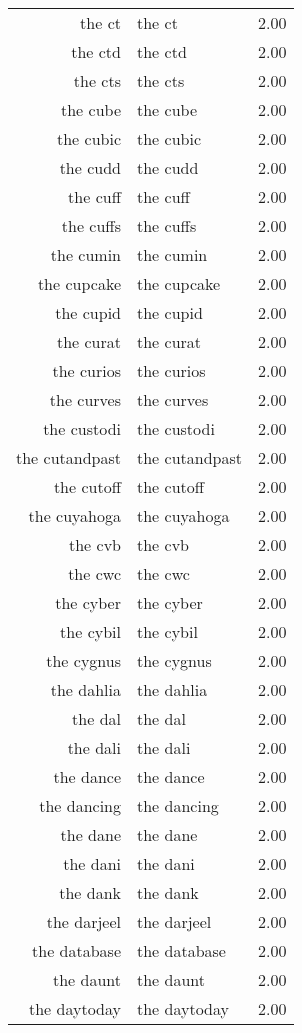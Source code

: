 \begin{table}[ht]
\begin{tabular}{rlr}
  the ct & the ct & 2.00 \\ 
  the ctd & the ctd & 2.00 \\ 
  the cts & the cts & 2.00 \\ 
  the cube & the cube & 2.00 \\ 
  the cubic & the cubic & 2.00 \\ 
  the cudd & the cudd & 2.00 \\ 
  the cuff & the cuff & 2.00 \\ 
  the cuffs & the cuffs & 2.00 \\ 
  the cumin & the cumin & 2.00 \\ 
  the cupcake & the cupcake & 2.00 \\ 
  the cupid & the cupid & 2.00 \\ 
  the curat & the curat & 2.00 \\ 
  the curios & the curios & 2.00 \\ 
  the curves & the curves & 2.00 \\ 
  the custodi & the custodi & 2.00 \\ 
  the cutandpast & the cutandpast & 2.00 \\ 
  the cutoff & the cutoff & 2.00 \\ 
  the cuyahoga & the cuyahoga & 2.00 \\ 
  the cvb & the cvb & 2.00 \\ 
  the cwc & the cwc & 2.00 \\ 
  the cyber & the cyber & 2.00 \\ 
  the cybil & the cybil & 2.00 \\ 
  the cygnus & the cygnus & 2.00 \\ 
  the dahlia & the dahlia & 2.00 \\ 
  the dal & the dal & 2.00 \\ 
  the dali & the dali & 2.00 \\ 
  the dance & the dance & 2.00 \\ 
  the dancing & the dancing & 2.00 \\ 
  the dane & the dane & 2.00 \\ 
  the dani & the dani & 2.00 \\ 
  the dank & the dank & 2.00 \\ 
  the darjeel & the darjeel & 2.00 \\ 
  the database & the database & 2.00 \\ 
  the daunt & the daunt & 2.00 \\ 
  the daytoday & the daytoday & 2.00 \\ 

\end{tabular}
\end{table}

